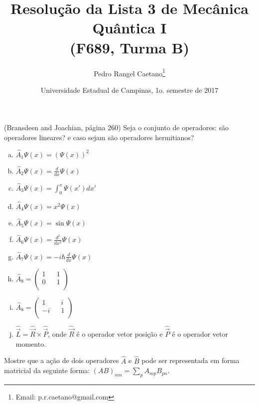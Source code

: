\documentclass[a4paper, 12pt, notitlepage]{article}
\begin{document}
\title{Resolução da Lista 3 de Mecânica Quântica I\\ (F689, Turma B)}
\author{Pedro Rangel Caetano\footnote{Email: p.r.caetano@gmail.com}} 
\date{Universidade Estadual de Campinas, 1o. semestre de 2017}
\maketitle

\tableofcontents
\pagebreak

\begin{enumerate}

(Bransdeen and Joachian, página 260)\linebreak
Seja o conjunto de operadores: são operadores lineares? e caso sejam são operadores hermitianos?
\begin{enumerate}[(a)]
  \item $\hat{A}_1\Psi(x) = \left(\Psi(x)\right)^2$
  \item $\hat{A}_2\Psi(x) = \frac{d}{dx} \Psi(x)$
  \item $\hat{A}_3\Psi(x) = \int_0^x \Psi(x')dx'$
  \item $\hat{A}_4\Psi(x) = x^2\Psi(x)$
  \item $\hat{A}_5\Psi(x) = \sin \Psi(x)$
  \item $\hat{A}_6\Psi(x) = \frac{d^2}{dx^2} \Psi(x)$
  \item $\hat{A}_7\Psi(x) = -i\hbar\frac{d}{dx}\Psi(x)$
  \item $\hat{A}_8 = 
  \begin{pmatrix} 
    1 && 1\\
    0 && 1\\
  \end{pmatrix}$
  \item $\hat{A}_8 = 
  \begin{pmatrix} 
    1 && i\\
    -i && 1\\
  \end{pmatrix}$
  \item $\hat{\vec{L}} = \hat{\vec{R}} \times \hat{\vec{P}}$, onde $\hat{\vec{R}}$ é o operador vetor posição e $\hat{\vec{P}}$ é o operador vetor momento.
\end{enumerate}

Mostre que a ação de dois operadores $\hat{A}$ e $\hat{B}$ pode ser representada em forma matricial da seguinte forma: $(AB)_{mn} = \sum_p A_{mp}B_{pn}$.


\end{enumerate}
\end{document}
